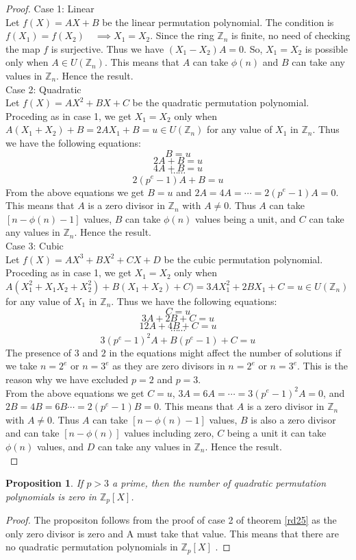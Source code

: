 \documentclass[10pt,a4paper]{amsart}
\newtheorem{proposition}[theorem]{Proposition}
\begin{document}
\begin{proof}
Case 1: Linear \\
Let $f(X)=AX+B$ be the linear permutation polynomial. The condition is $f(X_{1})=f(X_{2}) \quad \implies X_{1}=X_{2}$. Since the ring $\mathbb{Z}_{n}$ is finite, no need of checking the map $f$ is surjective. Thus we have $(X_{1}-X_{2})A=0$. So, $X_{1}=X_{2}$ is possible only when $A \in U(\mathbb{Z}_{n})$. This means that $A$ can take $\phi(n)$ and $B$ can take any values in $\mathbb{Z}_{n}$. Hence the result. \\
Case 2: Quadratic \\
Let $f(X)=AX^{2}+BX+C$ be the quadratic permutation polynomial. Proceding as in case 1, we get $X_{1}=X_{2}$ only when $A(X_{1}+X_{2})+B=2AX_{1}+B=u  \in U(\mathbb{Z}_{n})$ for any value of $X_{1}$ in 
$\mathbb{Z}_{n}$. Thus we have the following equations:
$$B=u$$
$$2A+B=u$$
$$4A+B=u$$
$$\cdots \cdots $$
$$2(p^{e}-1)A+B=u$$
From the above equations we get $B=u$ and $2A=4A=\cdots =2(p^{e}-1)A=0$. This means that $A$ is a zero divisor in $\mathbb{Z}_{n}$ with $A \neq 0$. Thus $A$ can take $[n-\phi(n)-1]$ values, $B$ can take $\phi(n)$ values being a unit, and $C$ can take any values in  $\mathbb{Z}_{n}$. Hence the result. \\
Case 3: Cubic \\
Let $f(X)=AX^{3}+BX^{2}+CX+D$ be the cubic permutation polynomial. Proceding as in case 1, we get $X_{1}=X_{2}$ only when $A(X_{1}^{2}+X_{1}X_{2}+X_{2}^{2})+B(X_{1}+X_{2})+C)=3AX_{1}^{2}+2BX_{1}+C=u  \in U(\mathbb{Z}_{n})$ for any value of $X_{1}$ in 
$\mathbb{Z}_{n}$. Thus we have the following equations:
$$C=u$$
$$3A+2B+C=u$$
$$12A+4B+C=u$$
$$\cdots \cdots $$
$$3(p^{e}-1)^{2}A+B(p^{e}-1)+C=u$$
The presence of $3$ and $2$ in the equations might affect the number of solutions if we take $n=2^{e}$ or $n=3^{e}$ as they are zero divisors in $n=2^{e}$ or $n=3^{e}$. This is the reason why we have excluded $p=2$ and $p=3$. \\
From the above equations we get $C=u$,  $3A=6A=\cdots =3(p^{e}-1)^{2}A=0$, and $2B=4B=6B \cdots = 2(p^{e}-1)B=0$. This means that $A$ is a zero divisor in $\mathbb{Z}_{n}$ with $A \neq 0$. Thus $A$ can take $[n-\phi(n)-1]$ values, $B$ is also a zero divisor and can take $[n-\phi(n)]$ values including zero,  $C$ being a unit it can take $\phi(n)$ values, and $D$ can take any values in  $\mathbb{Z}_{n}$. Hence the result. \\
\end{proof}

\begin{proposition}
If $p>3$ a prime, then the number of quadratic permutation polynomials is zero in $\mathbb{Z}_{p}[X]$. 
\end{proposition}
\begin{proof}
The propositon follows from the proof of case 2 of theorem \ref{rd25} as the only zero divisor is zero and A must take that value. This means that there are no quadratic permutation polynomials in $\mathbb{Z}_{p}[X]$ . 
\end{proof}
\end{document}
